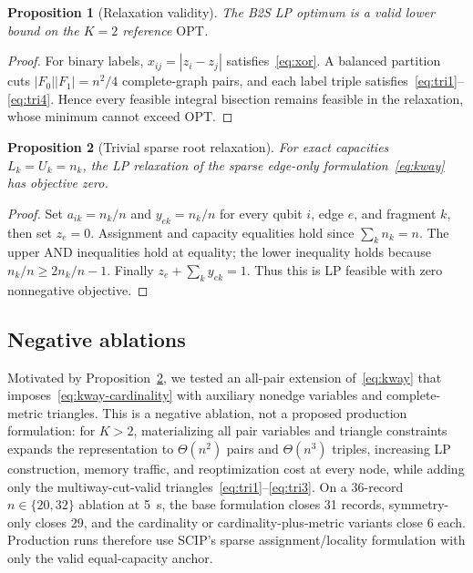 \documentclass[
  aps,
  pra,
  reprint,
  amsmath,
  amssymb,
  longbibliography,
  nofootinbib,
  floatfix
]{revtex4-2}
\theoremstyle{plain}
\newtheorem{proposition}{Proposition}
\newcommand{\OPT}{\mathrm{OPT}}
\begin{document}
\begin{proposition}[Relaxation validity]\label{prop:relax-valid}
The B2S LP optimum is a valid lower bound on the $K=2$ reference $\OPT$.
\end{proposition}
\begin{proof}
For binary labels, $x_{ij}=|z_i-z_j|$ satisfies~\eqref{eq:xor}. A balanced partition cuts $|F_0||F_1|=n^2/4$ complete-graph pairs, and each label triple satisfies~\eqref{eq:tri1}--\eqref{eq:tri4}. Hence every feasible integral bisection remains feasible in the relaxation, whose minimum cannot exceed $\OPT$.
\end{proof}

\begin{proposition}[Trivial sparse root relaxation]\label{prop:trivial-root}
For exact capacities $L_k=U_k=n_k$, the LP relaxation of the sparse edge-only formulation~\eqref{eq:kway} has objective zero.
\end{proposition}
\begin{proof}
Set $a_{ik}=n_k/n$ and $y_{ek}=n_k/n$ for every qubit $i$, edge $e$, and fragment $k$, then set $z_e=0$. Assignment and capacity equalities hold since $\sum_kn_k=n$. The upper AND inequalities hold at equality; the lower inequality holds because $n_k/n\geq2n_k/n-1$. Finally $z_e+\sum_ky_{ek}=1$. Thus this is LP feasible with zero nonnegative objective.
\end{proof}

\subsection{Negative ablations}

Motivated by Proposition~\ref{prop:trivial-root}, we tested an all-pair extension of~\eqref{eq:kway} that imposes~\eqref{eq:kway-cardinality} with auxiliary nonedge variables and complete-metric triangles. This is a negative ablation, not a proposed production formulation: for $K>2$, materializing all pair variables and triangle constraints expands the representation to $\Theta(n^2)$ pairs and $\Theta(n^3)$ triples, increasing LP construction, memory traffic, and reoptimization cost at every node, while adding only the multiway-cut-valid triangles~\eqref{eq:tri1}--\eqref{eq:tri3}. On a 36-record $n\in\{20,32\}$ ablation at 5~s, the base formulation closes 31 records, symmetry-only closes 29, and the cardinality or cardinality-plus-metric variants close 6 each. Production runs therefore use SCIP's sparse assignment/locality formulation with only the valid equal-capacity anchor.
\end{document}
